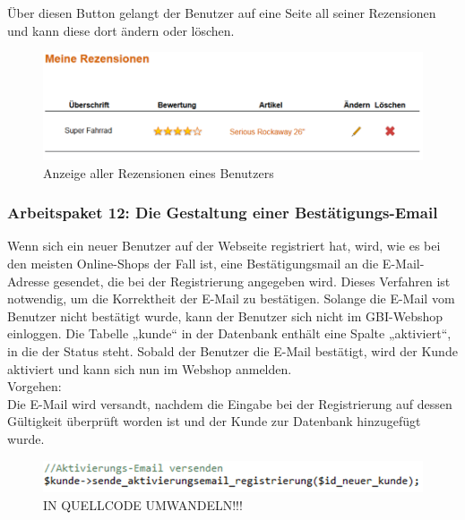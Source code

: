 Über diesen Button gelangt der Benutzer auf eine Seite all seiner Rezensionen und kann diese dort ändern oder löschen.

\begin{figure}[H]
\begin{center}
\includegraphics[width=12cm]{Bilder/Michael_Abbildung14-AnzeigeAllerRezensionenEinesBenutzers.png}
\end{center}
\caption{Anzeige aller Rezensionen eines Benutzers}
\end{figure}

\newpage

\subsubsection{Arbeitspaket 12: Die Gestaltung einer Bestätigungs-Email}

Wenn sich ein neuer Benutzer auf der Webseite registriert hat, wird, wie es bei den meisten Online-Shops der Fall ist, eine Bestätigungsmail an die E-Mail-Adresse gesendet, die bei der Registrierung angegeben wird. Dieses Verfahren ist notwendig, um die Korrektheit der E-Mail zu bestätigen. 
Solange die E-Mail vom Benutzer nicht bestätigt wurde, kann der Benutzer sich nicht im GBI-Webshop einloggen. Die Tabelle „kunde“ in der Datenbank enthält eine Spalte „aktiviert“, in die der Status steht. Sobald der Benutzer die E-Mail bestätigt, wird der Kunde aktiviert und kann sich nun im Webshop anmelden.
\\
Vorgehen:
\\
Die E-Mail wird versandt, nachdem die Eingabe bei der Registrierung auf dessen Gültigkeit überprüft worden ist und der Kunde zur Datenbank hinzugefügt wurde. 

\begin{figure}[H]
\begin{center}
\includegraphics[width=12cm]{Bilder/Michael_Quellcode1.png}
\end{center}
\caption{IN QUELLCODE UMWANDELN!!!}
\end{figure}

